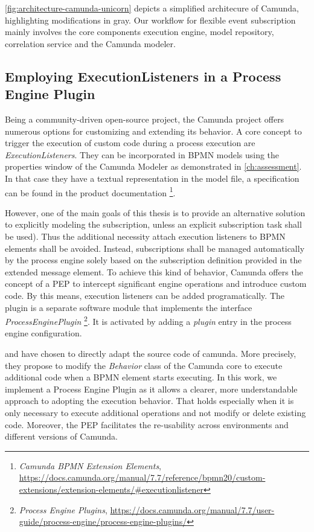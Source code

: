 \autoref{fig:architecture-camunda-unicorn} depicts a simplified architecure of Camunda, highlighting modifications in gray.
Our workflow for flexible event subscription mainly involves the core components execution engine, model repository, correlation service and the Camunda modeler.

\subsection{Employing ExecutionListeners in a Process Engine Plugin}
Being a community-driven open-source project, the Camunda project offers numerous options for customizing and extending its behavior.
A core concept to trigger the execution of custom code during a process execution are \textit{ExecutionListeners}.
They can be incorporated in BPMN models using the properties window of the Camunda Modeler as demonstrated in \autoref{ch:assessment}. In that case they have a textual representation in the model file, a specification can be found in the product documentation
\footnote{\textit{Camunda BPMN Extension Elements}, \url{https://docs.camunda.org/manual/7.7/reference/bpmn20/custom-extensions/extension-elements/\#executionlistener}}.

However, one of the main goals of this thesis is to provide an alternative solution to explicitly modeling the subscription, unless an explicit subscription task shall be used). Thus the additional necessity attach execution listeners to BPMN elements shall be avoided.
Instead, subscriptions shall be managed automatically by the process engine solely based on the subscription definition provided in the extended message element.
To achieve this kind of behavior, Camunda offers the concept of a \ac{PEP} to intercept significant engine operations and introduce custom code. 
By this means, execution listeners can be added programatically.
The plugin is a separate software module that implements the interface \textit{ProcessEnginePlugin}
\footnote{\textit{Process Engine Plugins}, \url{https://docs.camunda.org/manual/7.7/user-guide/process-engine/process-engine-plugins/}}.
It is activated by adding a \textit{plugin} entry in the process engine configuration.

\cite{mandal:2017} and \cite{Pufahl2017} have chosen to directly adapt the source code of camunda. More precisely, they propose to modify the \textit{Behavior} class of the Camunda core to execute additional code when a BPMN element starts executing.
In this work, we implement a Process Engine Plugin as it allows a clearer, more understandable approach to adopting the execution behavior. 
That holds especially when it is only necessary to execute additional operations and not modify or delete existing code.
Moreover, the PEP facilitates the re-usability across environments and different versions of Camunda.

